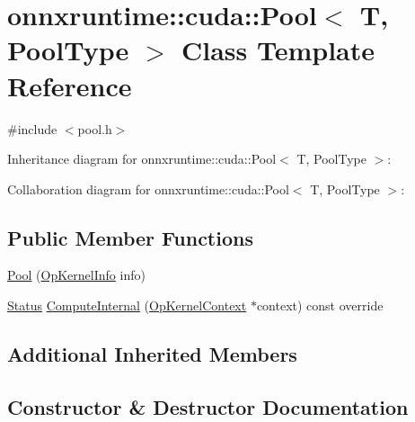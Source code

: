 \hypertarget{classonnxruntime_1_1cuda_1_1Pool}{}\section{onnxruntime\+:\+:cuda\+:\+:Pool$<$ T, Pool\+Type $>$ Class Template Reference}
\label{classonnxruntime_1_1cuda_1_1Pool}


{\ttfamily \#include $<$pool.\+h$>$}



Inheritance diagram for onnxruntime\+:\+:cuda\+:\+:Pool$<$ T, Pool\+Type $>$\+:


Collaboration diagram for onnxruntime\+:\+:cuda\+:\+:Pool$<$ T, Pool\+Type $>$\+:
\subsection*{Public Member Functions}
\begin{DoxyCompactItemize}
\item 
\mbox{\hyperlink{classonnxruntime_1_1cuda_1_1Pool_a3fb9f4e2e64906d1af9fbd4dbb81e160}{Pool}} (\mbox{\hyperlink{classonnxruntime_1_1OpKernelInfo}{Op\+Kernel\+Info}} info)
\item 
\mbox{\hyperlink{classonnxruntime_1_1common_1_1Status}{Status}} \mbox{\hyperlink{classonnxruntime_1_1cuda_1_1Pool_a682669ecd41f68812a68dc19c820d5be}{Compute\+Internal}} (\mbox{\hyperlink{classonnxruntime_1_1OpKernelContext}{Op\+Kernel\+Context}} $\ast$context) const override
\end{DoxyCompactItemize}
\subsection*{Additional Inherited Members}


\subsection{Constructor \& Destructor Documentation}
\mbox{\label{classonnxruntime_1_1cuda_1_1Pool_a3fb9f4e2e64906d1af9fbd4dbb81e160}} 

